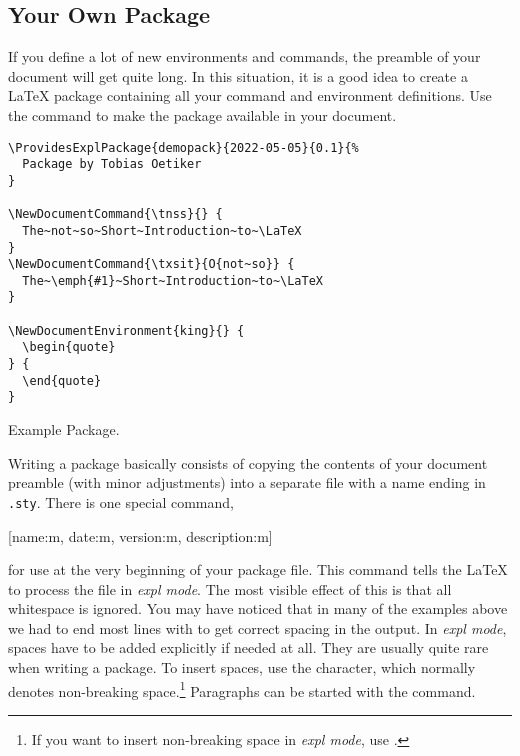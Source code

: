 \subsection{Your Own Package}

If you define a lot of new environments and commands, the preamble of
your document will get quite long. In this situation, it is a good
idea to create a \LaTeX{} package containing all your command and
environment definitions. Use the 
command to make the package available in your document.

\begin{listing}
  \begin{lined}{\textwidth}
    \begin{verbatim}
\ProvidesExplPackage{demopack}{2022-05-05}{0.1}{%
  Package by Tobias Oetiker
}

\NewDocumentCommand{\tnss}{} {
  The~not~so~Short~Introduction~to~\LaTeX
}
\NewDocumentCommand{\txsit}{O{not~so}} {
  The~\emph{#1}~Short~Introduction~to~\LaTeX
}

\NewDocumentEnvironment{king}{} {
  \begin{quote}
} {
  \end{quote}
}
\end{verbatim}
  \end{lined}
  \caption{Example Package.}\label{package}
\end{listing}

Writing a package basically consists of copying the contents of your document
preamble (with minor adjustments) into a separate file with a name ending in
\texttt{.sty}. There is one special command,
\begin{lscommand}
  [name:m, date:m, version:m, description:m]
\end{lscommand}
for use at the very beginning of your package file. This command tells the
\LaTeX{} to process the  file in \emph{expl mode}. The most visible effect of
this is that all whitespace is ignored. You may have noticed that in many of
the examples above we had to end most lines with \ai{\%} to get correct spacing
in the output. In \emph{expl mode}, spaces have to be added explicitly if
needed at all. They are usually quite rare when writing a package. To insert
spaces, use the \ai{\~} character, which normally denotes non-breaking
space.\footnote{If you want to insert non-breaking space in \emph{expl mode},
  use .} Paragraphs can be started with the  command.

